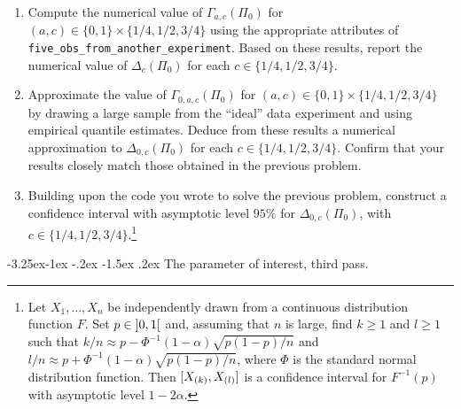 \documentclass[]{article}
\makeatletter
\let\rmarkdownfootnote\footnote%
\def\footnote{\protect\rmarkdownfootnote}
\renewcommand\subsection{\@startsection{subsection}{3}{\z@}%
                                     {-3.25ex\@plus -1ex \@minus -.2ex}%
                                     {-1.5ex \@plus .2ex}%
                                     {\normalfont\normalsize\bfseries}}
\theoremstyle{definition}
\theoremstyle{definition}
\theoremstyle{definition}
\theoremstyle{remark}
\makeatother
\begin{document}
\begin{enumerate}
\def\labelenumi{\arabic{enumi}.}
\item
  Compute the numerical value of \(\Gamma_{a,c}(\Pi_0)\) for
  \((a,c) \in \{0,1\} \times \{1/4, 1/2, 3/4\}\) using the appropriate
  attributes of \texttt{five\_obs\_from\_another\_experiment}. Based on
  these results, report the numerical value of \(\Delta_c(\Pi_0)\) for
  each \(c \in \{1/4, 1/2, 3/4\}\).
\item
  Approximate the value of \(\Gamma_{0,a,c}(\Pi_{0})\) for
  \((a,c) \in \{0,1\} \times \{1/4, 1/2, 3/4\}\) by drawing a large
  sample from the ``ideal'' data experiment and using empirical quantile
  estimates. Deduce from these results a numerical approximation to
  \(\Delta_{0,c} (\Pi_{0})\) for each \(c \in \{1/4, 1/2, 3/4\}\).
  Confirm that your results closely match those obtained in the previous
  problem.
\item
  Building upon the code you wrote to solve the previous problem,
  construct a confidence interval with asymptotic level \(95\%\) for
  \(\Delta_{0,c} (\Pi_{0})\), with
  \(c \in \{1/4, 1/2, 3/4\}\).\footnote{Let  $X_{1}, \ldots,
  X_{n}$  be  independently drawn  from  a  continuous distribution  function
  $F$. Set  $p \in  \interval[open]{0}{1}$ and, assuming  that $n$  is large,
  find   $k\geq  1$   and  $l   \geq   1$  such   that  $k/n   \approx  p   -
  \Phi^{-1}(1-\alpha)    \sqrt{p(1-p)/n}$    and    $l/n    \approx    p    +
  \Phi^{-1}(1-\alpha) \sqrt{p(1-p)/n}$,  where $\Phi$ is the  standard normal
  distribution function.  Then  $\interval{X_{(k)}}{X_{(l)}}$ is a confidence
  interval for $F^{-1}(p)$ with asymptotic level $1 - 2\alpha$.}
\end{enumerate}

\subsection{The parameter of interest, third pass.}
\label{subsec:parameter:third}
\end{document}
